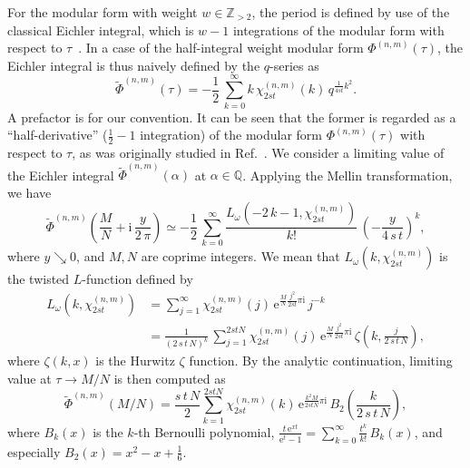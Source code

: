 \documentclass[12pt,reqno]{amsart}
\begin{document}
For the modular form with weight $w \in \mathbb{Z}_{>2}$, the period
is defined by use of the classical Eichler integral, which is $w-1$
integrations of the modular form with respect to
$\tau$~\cite{SLang76Book}.
In a case of the half-integral weight modular form
$\Phi^{(n,m)}(\tau)$,
the Eichler integral is thus naively defined by the $q$-series as~\cite{DZagie01a}
\begin{equation}
  \label{define_tilde}
  \widetilde{\Phi}^{(n,m)}(\tau)
  =
  -\frac{1}{2} \, \sum_{k=0}^\infty k \, 
  \chi_{2 s t}^{(n,m)}(k) \, q^{\frac{1}{4 s t} k^2} .
\end{equation}
A prefactor is for our convention.
It can be seen that
the former is regarded as a ``half-derivative''
($\frac{1}{2}-1$ integration) of the modular form
$\Phi^{(n,m)}(\tau)$ with respect to $\tau$,
as was originally studied in Ref.~.
We consider a limiting value of the Eichler integral
$\widetilde{\Phi}^{(n,m)}(\alpha)$ at $\alpha  \in \mathbb{Q}$.
Applying the Mellin transformation, we have
\begin{equation*}
  \widetilde{\Phi}^{(n,m)}
  \left(
    \frac{M}{N} +
    \mathrm{i} \, \frac{y}{2 \,  \pi}
  \right)
  \simeq
  - \frac{1}{2} \, \sum_{k=0}^\infty
  \frac{L_\omega(- 2 \, k -1 , \chi_{2 s t}^{(n,m)} )}{k!} \,
  \left(
    - \frac{y}{4 \,s \, t}
  \right)^k ,
\end{equation*}
where $y\searrow 0$, and $M,N$ are coprime integers.
We mean that $L_\omega (k,\chi_{2 s t }^{(n,m)})$ is the twisted
$L$-function defined by
\begin{align*}
  L_\omega(k, \chi_{2 s t}^{(n,m)})
  & =
  \sum_{j=1}^\infty \chi_{2 s t}^{(n,m)} (j) \,
  \mathrm{e}^{ \frac{M}{N} \frac{j^2}{2 s t}  \pi \mathrm{i}} \,
  j^{-k}
  \\
  & =
  \frac{1}{(2 \, s \, t \, N)^k} \,
  \sum_{j=1}^{2 s t N}
  \chi_{2 s t}^{(n,m)}(j) \,
  \mathrm{e}^{ \frac{M}{N} \frac{j^2}{2 s t} \pi \mathrm{i}} \,
  \zeta \left(k, \frac{j}{2 \, s \, t \, N}\right)
  ,
\end{align*}
where $\zeta(k,x)$ is the Hurwitz $\zeta$ function.
By the analytic continuation,
limiting value at $\tau \to M/N $ is then computed as
\begin{equation}
  \label{Eichler_for_MN}
  \widetilde{\Phi}^{(n,m)}(M/N)
  =
  \frac{s \, t \, N}{2}
  \sum_{k=1}^{2 s t N}
  \chi_{2 s t}^{(n,m)}(k) \,
  \mathrm{e}^{\frac{k^2 M}{2 s t N} \pi \mathrm{i}} \, 
  B_2\left(\frac{k}{2 \, s \, t \, N}\right) ,
\end{equation}
where $B_k(x)$ is the $k$-th Bernoulli polynomial,
$
\displaystyle
\frac{t \, \mathrm{e}^{x t}}{\mathrm{e}^t - 1}
=
\sum_{k=0}^\infty  \frac{t^k}{k!} \, B_k(x)
$, and especially
$B_2(x) = x^2 - x + \frac{1}{6}$.
\end{document}
